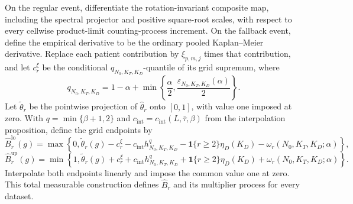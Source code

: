 On the regular event, differentiate the rotation-invariant composite map, including the spectral projector and positive square-root scales, with respect to every cellwise product-limit counting-process increment. On the fallback event, define the empirical derivative to be the ordinary pooled Kaplan--Meier derivative. Replace each patient contribution by \(\xi_{p,m,j}\) times that contribution, and let \(c_r^\xi\) be the conditional \(q_{N_0,K_T,K_D}\)-quantile of its grid supremum, where
\[
 q_{N_0,K_T,K_D}=1-\alpha+
 \min\left\{\frac{\alpha}{2},\frac{\varepsilon_{N_0,K_T,K_D}(\alpha)}{2}\right\}.
\]
Let \(\widetilde\theta_r\) be the pointwise projection of \(\widehat\theta_r\) onto \([0,1]\), with value one imposed at zero. With \(q=\min\{\beta+1,2\}\) and \(c_{\mathrm{int}}=c_{\mathrm{int}}(L,\bar\tau,\beta)\) from the interpolation proposition, define the grid endpoints by
\[
 \widehat B_r^{\mathrm{lo}}(g)=\max\!\left\{0,\widetilde\theta_r(g)-c_r^\xi-c_{\mathrm{int}}h_{N_0,K_T,K_D}^{q}-\mathbf 1\{r\ge2\}\eta_D(K_D)-\omega_r(N_0,K_T,K_D;\alpha)\right\},
\]
\[
 \widehat B_r^{\mathrm{up}}(g)=\min\!\left\{1,\widetilde\theta_r(g)+c_r^\xi+c_{\mathrm{int}}h_{N_0,K_T,K_D}^{q}+\mathbf 1\{r\ge2\}\eta_D(K_D)+\omega_r(N_0,K_T,K_D;\alpha)\right\}.
\]
Interpolate both endpoints linearly and impose the common value one at zero. This total measurable construction defines \(\widehat B_r\) and its multiplier process for every dataset.
